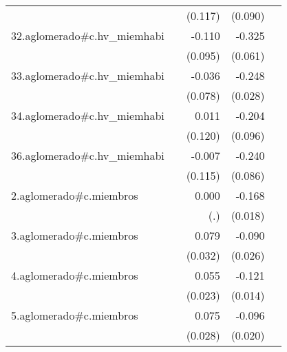 {\begin{longtable}{l*{4}{D{.}{.}{-1}}}
            &                     &     (0.117)         &     (0.090)         &                     \\
\addlinespace
32.aglomerado#c.hv\_miemhabi&                     &      -0.110         &      -0.325\sym{***}&                     \\
            &                     &     (0.095)         &     (0.061)         &                     \\
\addlinespace
33.aglomerado#c.hv\_miemhabi&                     &      -0.036         &      -0.248\sym{***}&                     \\
            &                     &     (0.078)         &     (0.028)         &                     \\
\addlinespace
34.aglomerado#c.hv\_miemhabi&                     &       0.011         &      -0.204\sym{*}  &                     \\
            &                     &     (0.120)         &     (0.096)         &                     \\
\addlinespace
36.aglomerado#c.hv\_miemhabi&                     &      -0.007         &      -0.240\sym{**} &                     \\
            &                     &     (0.115)         &     (0.086)         &                     \\
\addlinespace
2.aglomerado#c.miembros&                     &       0.000         &      -0.168\sym{***}&                     \\
            &                     &         (.)         &     (0.018)         &                     \\
\addlinespace
3.aglomerado#c.miembros&                     &       0.079\sym{*}  &      -0.090\sym{***}&                     \\
            &                     &     (0.032)         &     (0.026)         &                     \\
\addlinespace
4.aglomerado#c.miembros&                     &       0.055\sym{*}  &      -0.121\sym{***}&                     \\
            &                     &     (0.023)         &     (0.014)         &                     \\
\addlinespace
5.aglomerado#c.miembros&                     &       0.075\sym{**} &      -0.096\sym{***}&                     \\
            &                     &     (0.028)         &     (0.020)         &                     \\

\end{longtable}}
